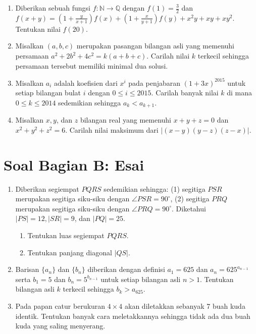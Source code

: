 \documentclass[11pt]{article}
\begin{document}
\begin{enumerate}
    \item Diberikan sebuah fungsi $f : \mathbb{N} \to \mathbb{Q}$ dengan $f(1) = \frac{3}{2}$ dan $f(x + y) = \left(1 + \frac{y}{x + 1}\right) f(x) + \left(1 + \frac{x}{y + 1}\right) f(y) + x^2y + xy + xy^2$. Tentukan nilai $f(20)$.
    
    \item Misalkan $(a, b, c)$ merupakan pasangan bilangan asli yang memenuhi persamaan $a^2 + 2b^2 + 4c^2 = k(a + b + c)$. Carilah nilai $k$ terkecil sehingga persamaan tersebut memiliki minimal dua solusi.
    
    \item Misalkan $a_i$ adalah koefisien dari $x^i$ pada penjabaran $(1 + 3x)^{2015}$ untuk setiap bilangan bulat $i$ dengan $0 \le i \le 2015$. Carilah banyak nilai $k$ di mana $0 \le k \le 2014$ sedemikian sehingga $a_k < a_{k+1}$.
    
    \item Misalkan $x, y$, dan $z$ bilangan real yang memenuhi $x + y + z = 0$ dan $x^2 + y^2 + z^2 = 6$. Carilah nilai maksimum dari $|(x - y)(y - z)(z - x)|$.
\end{enumerate}

\section*{Soal Bagian B: Esai}
\begin{enumerate}
    \item Diberikan segiempat $PQRS$ sedemikian sehingga: (1) segitiga $PSR$ merupakan segitiga siku-siku dengan $\angle PSR = 90^\circ$, (2) segitiga $PRQ$ merupakan segitiga siku-siku dengan $\angle PRQ = 90^\circ$. Diketahui $|PS| = 12, |SR| = 9$, dan $|PQ| = 25$. 
    \begin{enumerate}
        \item Tentukan luas segiempat $PQRS$.
        \item Tentukan panjang diagonal $|QS|$.
    \end{enumerate}
    
    \item Barisan $\{a_n\}$ dan $\{b_n\}$ diberikan dengan definisi $a_1 = 625$ dan $a_n = 625^{a_{n-1}}$ serta $b_1 = 5$ dan $b_n = 5^{b_{n-1}}$ untuk setiap bilangan asli $n > 1$. Tentukan bilangan asli $k$ terkecil sehingga $b_k > a_{625}$.
    
    \item Pada papan catur berukuran $4 \times 4$ akan diletakkan sebanyak 7 buah kuda identik. Tentukan banyak cara meletakkannya sehingga tidak ada dua buah kuda yang saling menyerang.
\end{enumerate}
\end{document}
